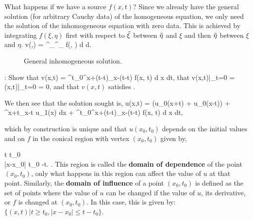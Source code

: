 %
What happens if we have a source $f(x,t)$? Since we already have the general solution (for arbitrary Cauchy data) of the homogeneous equation, we only need the solution of the inhomogeneous equation with zero data. 
This is achieved by integrating $f(\xi, \eta)$ first with respect to $\tilde \xi$ 
between $\tilde \eta$ and $\xi$ and
then $\tilde \eta $ between $\xi$ and $\eta$.
\beq
v(\eta,\xi) =  \int^{\eta}_{\xi}\lp\int^{\xi}_{\ti \eta} f(\ti \xi, \ti
\eta) d \ti \xi \rp d\ti \eta.
\eeq

\espa 
\begin{figure}[htbp]
  \begin{center}
    \caption{General inhomogeneous solution.}
    \label{fig:13_4}
  \end{center}
\end{figure}

\espa

\ejer:
Show that 
\beq
v(x,t) = \int^t_0\lp\int^{x+(t-\ti t)}_{x-(t-\ti t)} f(\ti x, \ti
t) d \ti x \rp d\ti t,
\eeq
that
\beq v(x,t)|_{t=0} =  (x,t)|_{t=0} = 0,\eeq
and that $v(x,t)$ satisfies .
\espa

\noi We then see that the solution sought is,
{\small
\beq
u(x,t) =  (u_0(x+t) + u_0(x-t)) +  \int^{x+t}_{x-t}
u_1(\ti x) d\ti x +
\int^t_0\lp\int^{x+(t-\ti t)}_{x-(t-\ti t)} f(\ti x, \ti
t) d \ti x \rp d\ti t,
\eeq
}

\noi which by construction is unique and that $u(x_0,t_0)$ depends on the initial values and on $f$ in the conical region with vertex $(x_0,t_0)$ given by,

\beq
\lb{}
t \leq t_0\\
|x-x_0| \leq t_0 -t.
\earr\right.
\eeq
This region is called the {\bf domain of dependence} of the point $(x_0,t_0)$, 
only what happens in this
region can affect the value of $u$ at that point.
Similarly, the {\bf domain of influence} of a point $(x_0,t_0)$ is defined
as the set of
points where the value of $u$ can be changed if the
value of $u$, its derivative, or $f$ is changed at $(x_0,t_0)$.
In this case, this is given by: $\{(x,t) | t \geq t_0, |x-x_0| \leq
t - t_0 \}$.

